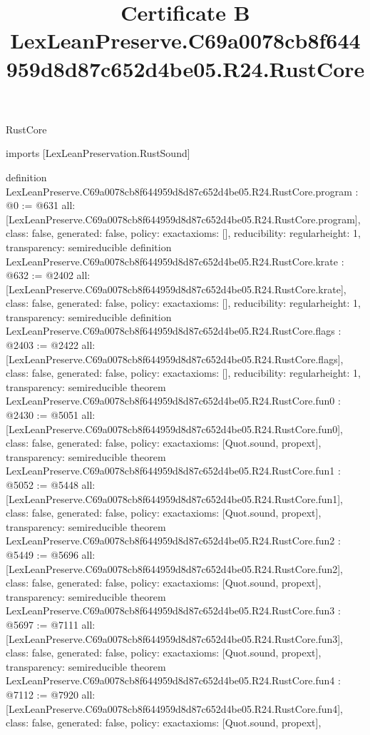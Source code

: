 \begin{lexlean}{RustCore}
\title{Certificate B LexLeanPreserve.C69a0078cb8f644959d8d87c652d4be05.R24.RustCore}
\begin{coremodule}
imports [LexLeanPreservation.RustSound]

definition LexLeanPreserve.C69a0078cb8f644959d8d87c652d4be05.R24.RustCore.program : @0 := @631 {
  all: [LexLeanPreserve.C69a0078cb8f644959d8d87c652d4be05.R24.RustCore.program],
  class: false,
  generated: false,
  policy: exact{axioms: []},
  reducibility: regular{height: 1},
  transparency: semireducible
}
definition LexLeanPreserve.C69a0078cb8f644959d8d87c652d4be05.R24.RustCore.krate : @632 := @2402 {
  all: [LexLeanPreserve.C69a0078cb8f644959d8d87c652d4be05.R24.RustCore.krate],
  class: false,
  generated: false,
  policy: exact{axioms: []},
  reducibility: regular{height: 1},
  transparency: semireducible
}
definition LexLeanPreserve.C69a0078cb8f644959d8d87c652d4be05.R24.RustCore.flags : @2403 := @2422 {
  all: [LexLeanPreserve.C69a0078cb8f644959d8d87c652d4be05.R24.RustCore.flags],
  class: false,
  generated: false,
  policy: exact{axioms: []},
  reducibility: regular{height: 1},
  transparency: semireducible
}
theorem LexLeanPreserve.C69a0078cb8f644959d8d87c652d4be05.R24.RustCore.fun0 : @2430 := @5051 {
  all: [LexLeanPreserve.C69a0078cb8f644959d8d87c652d4be05.R24.RustCore.fun0],
  class: false,
  generated: false,
  policy: exact{axioms: [Quot.sound, propext]},
  transparency: semireducible
}
theorem LexLeanPreserve.C69a0078cb8f644959d8d87c652d4be05.R24.RustCore.fun1 : @5052 := @5448 {
  all: [LexLeanPreserve.C69a0078cb8f644959d8d87c652d4be05.R24.RustCore.fun1],
  class: false,
  generated: false,
  policy: exact{axioms: [Quot.sound, propext]},
  transparency: semireducible
}
theorem LexLeanPreserve.C69a0078cb8f644959d8d87c652d4be05.R24.RustCore.fun2 : @5449 := @5696 {
  all: [LexLeanPreserve.C69a0078cb8f644959d8d87c652d4be05.R24.RustCore.fun2],
  class: false,
  generated: false,
  policy: exact{axioms: [Quot.sound, propext]},
  transparency: semireducible
}
theorem LexLeanPreserve.C69a0078cb8f644959d8d87c652d4be05.R24.RustCore.fun3 : @5697 := @7111 {
  all: [LexLeanPreserve.C69a0078cb8f644959d8d87c652d4be05.R24.RustCore.fun3],
  class: false,
  generated: false,
  policy: exact{axioms: [Quot.sound, propext]},
  transparency: semireducible
}
theorem LexLeanPreserve.C69a0078cb8f644959d8d87c652d4be05.R24.RustCore.fun4 : @7112 := @7920 {
  all: [LexLeanPreserve.C69a0078cb8f644959d8d87c652d4be05.R24.RustCore.fun4],
  class: false,
  generated: false,
  policy: exact{axioms: [Quot.sound, propext]},
}
\end{coremodule}
\end{lexlean}
